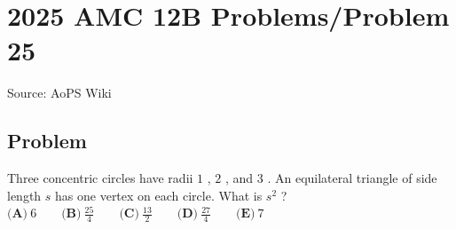 \documentclass[12pt]{article}
\begin{document}
\section*{{2025 AMC 12B Problems/Problem 25}}
Source: AoPS Wiki

\subsection*{Problem}
Three concentric circles have radii $1$ , $2$ , and $3$ . An equilateral triangle of side length $s$ has one vertex on each circle. What is $s^{2}$ ? $\textbf{(A)}~6 \qquad \textbf{(B)}~\frac{25}{4} \qquad \textbf{(C)}~\frac{13}{2} \qquad \textbf{(D)}~\frac{27}{4} \qquad \textbf{(E)}~7$
\end{document}
